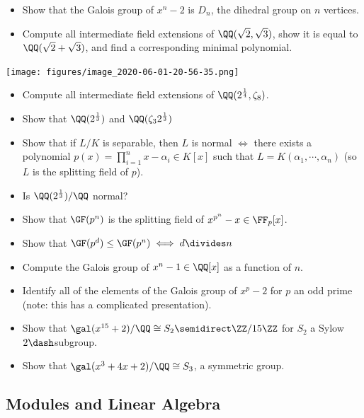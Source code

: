 \begin{itemize}
\tightlist
\item
  Show that the Galois group of \(x^n - 2\) is \(D_n\), the dihedral
  group on \(n\) vertices.
\item
  Compute all intermediate field extensions of
  \(\QQ(\sqrt 2, \sqrt 3)\), show it is equal to
  \(\QQ(\sqrt 2 + \sqrt 3)\), and find a corresponding minimal
  polynomial.
\end{itemize}

\texttt{[image: figures/image\_2020-06-01-20-56-35.png]}

\begin{itemize}
\tightlist
\item
  Compute all intermediate field extensions of
  \(\QQ(2^{1\over 4}, \zeta_8)\).
\item
  Show that \(\QQ(2^{1\over 3})\) and \(\QQ(\zeta_3 2^{1\over 3})\)
\item
  Show that if \(L/K\) is separable, then \(L\) is normal \(\iff\) there
  exists a polynomial \(p(x) = \prod_{i=1}^n x- \alpha_i\in K[x]\) such
  that \(L = K(\alpha_1, \cdots, \alpha_n)\) (so \(L\) is the splitting
  field of \(p\)).
\item
  Is \(\QQ(2^{1\over 3})/\QQ\) normal?
\item
  Show that \(\GF(p^n)\) is the splitting field of
  \(x^{p^n} - x \in \FF_p[x]\).
\item
  Show that \(\GF(p^d) \leq \GF(p^n) \iff d\divides n\)
\item
  Compute the Galois group of \(x^n - 1 \in \QQ[x]\) as a function of
  \(n\).
\item
  Identify all of the elements of the Galois group of \(x^p-2\) for
  \(p\) an odd prime (note: this has a complicated presentation).
\item
  Show that \(\gal(x^{15}+2)/\QQ \cong S_2 \semidirect \ZZ/15\ZZ\) for
  \(S_2\) a Sylow \(2\dash\)subgroup.
\item
  Show that \(\gal(x^3+4x+2)/\QQ \cong S_3\), a symmetric group.
\end{itemize}

\hypertarget{modules-and-linear-algebra}{%
\subsection{Modules and Linear
Algebra}\label{modules-and-linear-algebra}}

